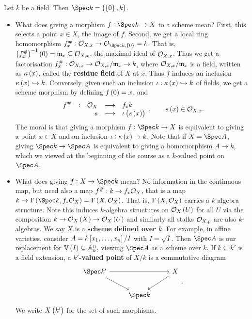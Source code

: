 \begin{example*}
Let $ k $ be a field. Then $ \Spec k = \br{\cbr{0}, k} $.
\begin{itemize}
\item What does giving a morphism $ f : \Spec k \to X $ to a scheme mean? First, this selects a point $ x \in X $, the image of $ f $. Second, we get a local ring homomorphism $ f_x^\# : \OOO_{X, x} \to \OOO_{\Spec k, \cbr{0}} = k $. That is, $ \br{f_x^\#}^{-1}\br{0} = \mmm_x \subseteq \OOO_{X, x} $, the maximal ideal of $ \mathcal{O}_{X, x} $. Thus we get a factorisation $ f_x^\# : \mathcal{O}_{X, x} \to \mathcal{O}_{X, x} / \mathfrak{m}_x \to k $, where $ \mathcal{O}_{X, x} / \mathfrak{m}_x $ is a field, written as $ \kappa\br{x} $, called the \textbf{residue field} of $ X $ at $ x $. Thus $ f $ induces an inclusion $ \kappa\br{x} \hookrightarrow k $. Conversely, given such an inclusion $ \iota : \kappa\br{x} \hookrightarrow k $ of fields, we get a scheme morphism by defining $ f\br{0} = x $, and
$$ \function[f^\#]{\OOO_X}{f_*k}{s}{\iota\br{s\br{x}}}, \qquad s\br{x} \in \OOO_{X, x}. $$
The moral is that giving a morphism $ f : \Spec k \to X $ is equivalent to giving a point $ x \in X $ and an inclusion $ \iota : \kappa\br{x} \to k $. Note that if $ X = \Spec A $, giving $ \Spec k \to \Spec A $ is equivalent to giving a homomorphism $ A \to k $, which we viewed at the beginning of the course as a $ k $-valued point on $ \Spec A $.


\item What does giving $ f : X \to \Spec k $ mean? No information in the continuous map, but need also a map $ f^\# : k \to f_*\mathcal{O}_X $, that is a map $ k \to \Gamma\br{\Spec k, f_*\OOO_X} = \Gamma\br{X, \OOO_X} $. That is, $ \Gamma\br{X, \OOO_X} $ carries a $ k $-algebra structure. Note this induces $ k $-algebra structures on $ \OOO_X\br{U} $ for all $ U $ via the composition $ k \to \OOO_X\br{X} \to \OOO_X\br{U} $ and similarly all stalks $ \mathcal{O}_{X, p} $ are also $ k $-algebras. We say $ X $ is a \textbf{scheme defined over $ k $}. For example, in affine varieties, consider $ A = k\sbr{x_1, \dots, x_n} / I $ with $ I = \sqrt{I} $. Then $ \Spec A $ is our replacement for $ \VV\br{I} \subseteq \AA_k^n $, viewing $ \Spec A $ as a scheme over $ k $. If $ k \subseteq k' $ is a field extension, a \textbf{$ k' $-valued point} of $ X / k $ is a commutative diagram
$$
\begin{tikzcd}
\Spec k' \arrow{rr} \arrow{dr} & & X \arrow{dl} \\
& \Spec k &
\end{tikzcd}.
$$
We write $ X\br{k'} $ for the set of such morphisms.
\end{itemize}
\end{example*}


